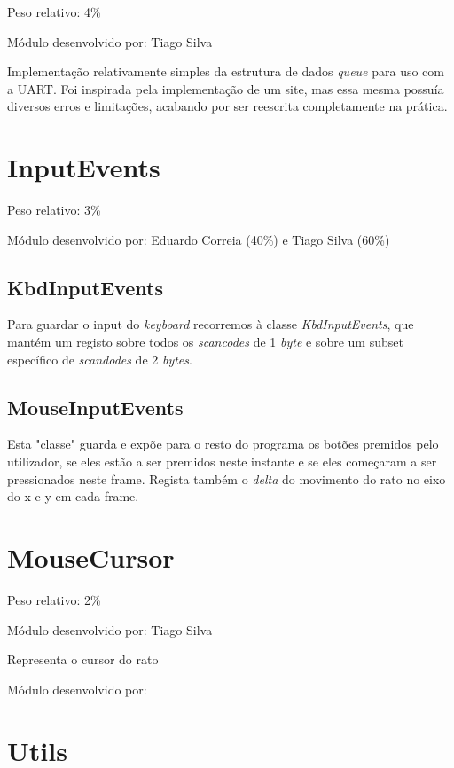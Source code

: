 \documentclass{report}
\begin{document}
Peso relativo: 4\%

Módulo desenvolvido por: Tiago Silva
\newline

Implementação relativamente simples da estrutura de dados \textit{queue} para uso com a UART. Foi inspirada pela implementação de um site, mas essa mesma possuía diversos erros e limitações, acabando por ser reescrita completamente na prática.

\section{InputEvents}

Peso relativo: 3\%

Módulo desenvolvido por: Eduardo Correia (40\%) e Tiago Silva (60\%)

\subsection{KbdInputEvents}

Para guardar o input do \textit{keyboard} recorremos à classe \textit{KbdInputEvents}, que mantém um registo sobre todos os \textit{scancodes} de 1 \textit{byte} e sobre um subset específico de \textit{scandodes} de 2 \textit{bytes}.

\subsection{MouseInputEvents}

Esta "classe" guarda e expõe para o resto do programa os botões premidos pelo utilizador, se eles estão a ser premidos neste instante e se eles começaram a ser pressionados neste frame. Regista também o \textit{delta} do movimento do rato no eixo do x e y em cada frame.

\section{MouseCursor}

Peso relativo: 2\%

Módulo desenvolvido por: Tiago Silva

Representa o cursor do rato\newline

Módulo desenvolvido por: 

\section{Utils}
\end{document}
